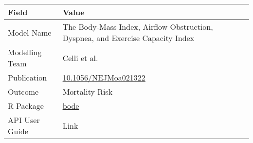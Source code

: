 \documentclass[
]{book}
\begin{document}
\begin{longtable}[]{@{}ll@{}}
\toprule
\begin{minipage}[b]{0.45\columnwidth}\raggedright
Field\strut
\end{minipage} & \begin{minipage}[b]{0.49\columnwidth}\raggedright
Value\strut
\end{minipage}\tabularnewline
\midrule
\endhead
\begin{minipage}[t]{0.45\columnwidth}\raggedright
Model Name\strut
\end{minipage} & \begin{minipage}[t]{0.49\columnwidth}\raggedright
The Body-Mass Index, Airflow Obstruction, Dyspnea, and Exercise Capacity Index\strut
\end{minipage}\tabularnewline
\begin{minipage}[t]{0.45\columnwidth}\raggedright
Modelling Team\strut
\end{minipage} & \begin{minipage}[t]{0.49\columnwidth}\raggedright
Celli et al.\strut
\end{minipage}\tabularnewline
\begin{minipage}[t]{0.45\columnwidth}\raggedright
Publication\strut
\end{minipage} & \begin{minipage}[t]{0.49\columnwidth}\raggedright
\href{https://doi.org/10.1056/NEJMoa021322}{10.1056/NEJMoa021322}\strut
\end{minipage}\tabularnewline
\begin{minipage}[t]{0.45\columnwidth}\raggedright
Outcome\strut
\end{minipage} & \begin{minipage}[t]{0.49\columnwidth}\raggedright
Mortality Risk\strut
\end{minipage}\tabularnewline
\begin{minipage}[t]{0.45\columnwidth}\raggedright
R Package\strut
\end{minipage} & \begin{minipage}[t]{0.49\columnwidth}\raggedright
\href{https://github.com/resplab/bode}{bode}\strut
\end{minipage}\tabularnewline
\begin{minipage}[t]{0.45\columnwidth}\raggedright
API User Guide\strut
\end{minipage} & \begin{minipage}[t]{0.49\columnwidth}\raggedright
Link\strut
\end{minipage}\tabularnewline
\bottomrule
\end{longtable}
\end{document}
